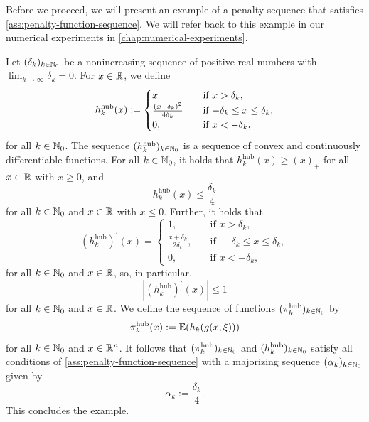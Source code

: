 Before we proceed, we will present an example of a penalty sequence that
satisfies \cref{ass:penalty-function-sequence}.
We will refer back to this example in our numerical experiments in \cref{chap:numerical-experiments}.
\begin{example}
    \label{ex:huber-type-penalty}
    Let $(\delta_k)_{k\in\mathbb{N}_0}$ be a nonincreasing sequence of positive real numbers
    with $\lim_{k\to\infty} \delta_k = 0$.
    For $x\in\mathbb{R}$, we define
    \[
        h_k^{\text{hub}}(x)
        :=
        \begin{cases}
            x \quad&\textnormal{if $x > \delta_k$}, \\
            \frac{(x + \delta_k)^2}{4\delta_k} \quad&\textnormal{if $-\delta_k \leq x \leq \delta_k$}, \\
            0, \quad&\textnormal{if $x < -\delta_k$},
        \end{cases}
    \]
    for all $k\in\mathbb{N}_0$. The sequence $(h_k^\text{hub})_{k\in\mathbb{N}_0}$ is a sequence of convex and continuously
    differentiable functions. For all $k\in\mathbb{N}_0$, it holds that
    $h_k^\text{hub}(x) \geq (x)_+$ for all $x\in\mathbb{R}$ with $x \geq 0$,
    and
    \[
        h_k^{\text{hub}}(x) \leq \frac{\delta_k}{4}
    \]
    for all $k\in\mathbb{N}_0$ and $x\in\mathbb{R}$ with $x \leq 0$.
    Further, it holds that
    \[
        (h_k^{\text{hub}})^\prime(x) = \begin{cases}
            1, \quad&\text{if } x > \delta_k, \\
            \frac{x + \delta_k}{2\delta_k}, \quad&\text{if } -\delta_k \leq x \leq \delta_k, \\
            0, \quad&\text{if $x < -\delta_k$,}
        \end{cases}
    \]
    for all $k\in\mathbb{N}_0$ and $x\in\mathbb{R}$, so, in particular,
    \[
        |(h_k^{\text{hub}})^\prime(x)|
        \leq
        1
    \]
    for all $k\in\mathbb{N}_0$ and $x\in\mathbb{R}$.
    We define the sequence of functions $(\pi_k^\text{hub})_{k\in\mathbb{N}_0}$ by
    \[
        \pi_k^\text{hub}(x) := \mathbb{E}(h_k(g(x, \xi)))
    \]
    for all $k\in\mathbb{N}_0$ and $x\in\mathbb{R}^n$.
    It follows that $(\pi_k^\text{hub})_{k\in\mathbb{N}_0}$ and $(h_k^\text{hub})_{k\in\mathbb{N}_0}$
    satisfy all conditions of \cref{ass:penalty-function-sequence} with
    a majorizing sequence $(\alpha_k)_{k\in\mathbb{N}_0}$ given by
    \[
        \alpha_k := \frac{\delta_k}{4}.
    \]
    This concludes the example.
\end{example}

